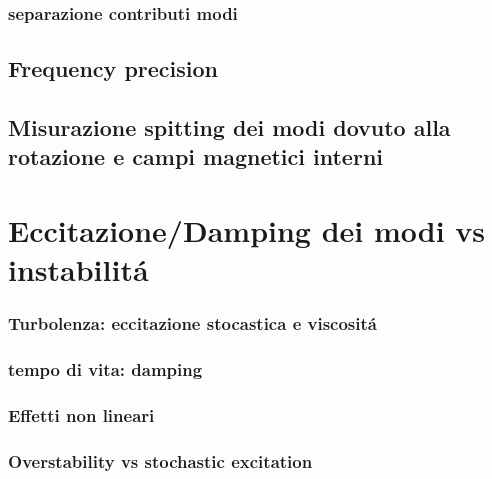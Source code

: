\documentclass[../main.tex]{subfiles}
\begin{document}
\subsection{separazione contributi modi}

\section{Frequency precision}

\section{Misurazione spitting dei modi dovuto alla rotazione e campi magnetici interni}

\begin{refsection}

\nocite{*}
\begingroup
\let\clearpage\relax
\printbibliography
\endgroup
\end{refsection}
\nocite{*}
\printbibliography[keyword={rotation}]

\chapter{Eccitazione/Damping dei modi vs instabilit\'a}

\subsection{Turbolenza: eccitazione stocastica e viscosit\'a}

\subsection{tempo di vita: damping}

\subsection{Effetti non lineari}

\subsection{Overstability vs stochastic excitation}
\end{document}
